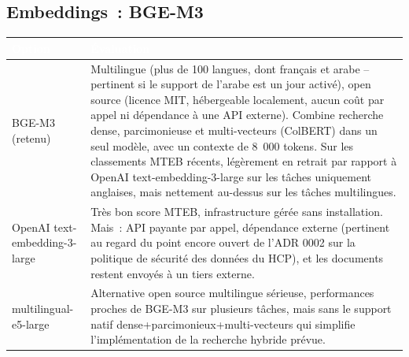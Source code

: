 \documentclass[11pt,a4paper]{article}
\newcommand{\tblhead}[1]{\textcolor{white}{\textbf{#1}}}
\begin{document}
\subsection{Embeddings~: BGE-M3}
\begin{longtable}{@{}p{3.6cm}p{11.9cm}@{}}
\rowcolor{navy}
\tblhead{Option} & \tblhead{\'Evaluation} \\
\midrule
\endhead
BGE-M3 (retenu) & Multilingue (plus de 100 langues, dont fran\c{c}ais et arabe -- pertinent si le support de l'arabe est un jour activ\'e), open source (licence MIT, h\'ebergeable localement, aucun co\^ut par appel ni d\'ependance \`a une API externe). Combine recherche dense, parcimonieuse et multi-vecteurs (ColBERT) dans un seul mod\`ele, avec un contexte de 8~000 tokens. Sur les classements MTEB r\'ecents, l\'eg\`erement en retrait par rapport \`a OpenAI text-embedding-3-large sur les t\^aches uniquement anglaises, mais nettement au-dessus sur les t\^aches multilingues. \\
OpenAI text-embedding-3-large & Tr\`es bon score MTEB, infrastructure g\'er\'ee sans installation. Mais~: API payante par appel, d\'ependance externe (pertinent au regard du point encore ouvert de l'ADR 0002 sur la politique de s\'ecurit\'e des donn\'ees du HCP), et les documents restent envoy\'es \`a un tiers externe. \\
multilingual-e5-large & Alternative open source multilingue s\'erieuse, performances proches de BGE-M3 sur plusieurs t\^aches, mais sans le support natif dense+parcimonieux+multi-vecteurs qui simplifie l'impl\'ementation de la recherche hybride pr\'evue. \\
\end{longtable}
\end{document}

